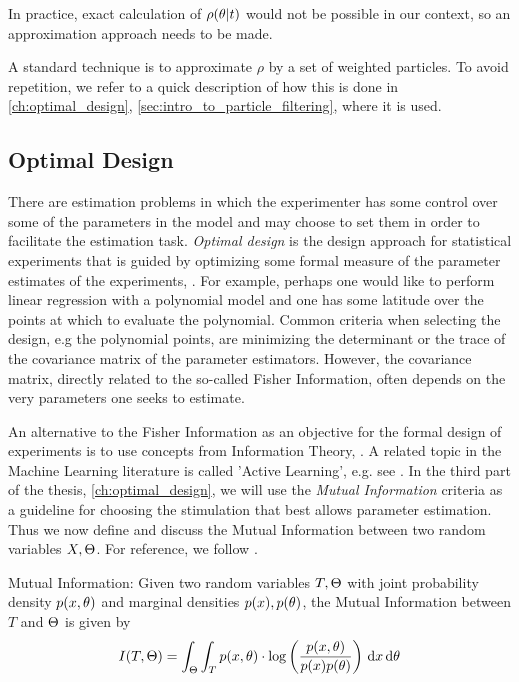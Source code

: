 In practice, exact calculation of $\rho({ \theta}|t)$ would not be possible in our
context, so an approximation approach needs to be made. 

A standard technique is to approximate $\rho$ by a set of weighted particles. To
avoid repetition, we refer to a quick description of how this is done in
\cref{ch:optimal_design}, \cref{sec:intro_to_particle_filtering}, where it is
used.
 
\subsection{Optimal Design}
\label{sec:optimal_design}
There are estimation problems in which the experimenter has some control over
some of the parameters in the model and may choose to set them in order to
facilitate the estimation task. {\sl Optimal design} is the design approach for
statistical experiments that is guided by optimizing some formal measure of the
parameter estimates of the experiments, \cite{Pukelsheim2006}. For example,
perhaps one would like to perform linear regression with a polynomial model and
one has some latitude over the points at which to evaluate the polynomial.
Common criteria when selecting the design, e.g the polynomial points, are
minimizing the determinant or the trace of the covariance matrix of the
parameter estimators. However, the covariance matrix, directly related to the
so-called Fisher Information, often depends on the very parameters one seeks to
estimate.

An alternative to the Fisher Information as an objective for the formal design
of experiments is to use concepts from Information Theory, \cite{MacKay2003}.
A related topic in the Machine Learning literature is called 'Active Learning',
e.g. see \cite{Cohn1996,Settles2010,Seeger2008}. In the third part of the
thesis, \cref{ch:optimal_design}, we will use the {\sl Mutual Information}
criteria as a guideline for choosing the stimulation that best allows parameter
estimation. Thus we now define and discuss the Mutual Information between two
random variables $X, {\Theta}$. For reference, we follow \cite{MacKay2003}.

\begin{defn}Mutual Information:
Given two random variables $T,{\Theta}$ with joint probability density
$p(x,{ \theta})$ and marginal densities $p(x), p({ \theta})$, the Mutual Information between
$T$ and ${\Theta}$ is given by
\begin{equation}
I(T,\Theta) = \int_\Theta \int_T p(x,{ \theta}) \cdot \log \left(
\frac{p(x,{ \theta})}{p(x)p({ \theta})}\right) \, \mathrm{d} x \, \mathrm{d} { \theta}
\label{eq:mutual_info_defn}
\end{equation}
\end{defn}

